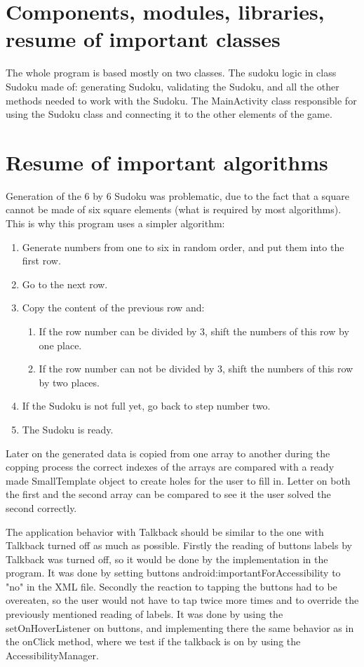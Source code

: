 \documentclass[a4paper,twoside,12pt]{book}
\begin{document}
\section {Components, modules, libraries, resume of important classes}

\par
The whole program is based mostly on two classes. The sudoku logic in class Sudoku made of: generating Sudoku, validating the Sudoku, and all the other methods needed to work with the Sudoku. The MainActivity class responsible for using the Sudoku class and connecting it to the other elements of the game.

\section {Resume of important algorithms}
\par
Generation of the 6 by 6 Sudoku was problematic, due to the fact that a square cannot be made of six square elements (what is required by most algorithms). This is why this program uses a simpler algorithm:
\begin{enumerate}
	\item Generate numbers from one to six in random order, and put them into the first row.
	\item Go to the next row.
	\item Copy the content of the previous row and: 
	\begin{enumerate}
   		 \item If the row number can be divided by 3, shift the numbers of this row by one place.
   		 \item If the row number can not be divided by 3, shift the numbers of this row by two places.
  	\end{enumerate}
	\item If the Sudoku is not full yet, go back to step number two.
	\item The Sudoku is ready.
\end{enumerate}

\par Later on the generated data is copied from one array to another during the copping process the correct indexes of the arrays are compared with a ready made SmallTemplate object to create holes for the user to fill in. Letter on both the first and the second array can be compared to see it the user solved the second correctly.

\par The application behavior with Talkback should be similar to the one with Talkback turned off as much as possible. Firstly the reading of buttons labels by Talkback was turned off, so it would be done by the implementation in the program. It was done by setting buttons android:importantForAccessibility to "no" in the XML file. Secondly the reaction to tapping the buttons had to be overeaten, so the user would not have to tap twice more times and to override the previously mentioned reading of labels. It was done by using the setOnHoverListener on buttons, and implementing there the same behavior as in the onClick method, where we test if the talkback is on by using the AccessibilityManager.
\end{document}
